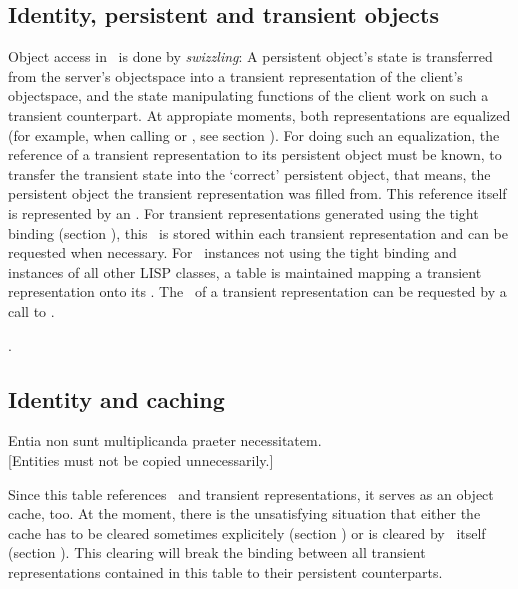  {}

\subsection{Identity, persistent and transient objects}

Object access in \plob\ is done by \emph{swizzling}: A persistent
object's state is transferred from the server's objectspace
into a transient representation of the client's
objectspace, and the state manipulating functions of the client work
on such a transient counterpart. At appropiate moments, both
representations are equalized (for example, when calling
 or , see section
). For doing such an equalization, the
reference of a transient representation to its persistent object must
be known, to transfer the transient state into the `correct'
persistent object, that means, the persistent object the transient
representation was filled from. This reference itself is represented
by an \objid. For transient representations generated using the tight
binding (section ), this \objid\ is stored
within each transient representation and can be requested when
necessary. For \clos\ instances not using the tight binding and
instances of all other LISP classes, a table is maintained mapping a
transient representation onto its \objid. The \objid\ of a transient
representation can be requested by a call to
.

 {}.

\subsection{Identity and caching}%
\label{sec:IdAndCache}

\begin{fortune}%
  \hspace*{\fill}Entia non sunt multiplicanda praeter necessitatem.\\ 
  \hspace*{\fill}[Entities must not be copied unnecessarily.]
%
\end{fortune}%

Since this table references \objid[s]\ and transient representations,
it serves as an object cache, too. At the moment, there is the unsatisfying situation
that either the cache has to be cleared sometimes explicitely (section
) or is cleared by \plob\ itself
(section ).  This clearing will break
the binding between all transient representations contained in this
table to their persistent counterparts.

